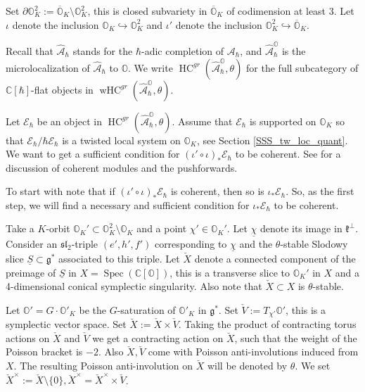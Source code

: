 \documentclass[12pt]{amsart}
\newcommand{\C}{\mathbb{C}}
\newcommand{\A}{\mathcal{A}}
\newcommand{\g}{\mathfrak{g}}
\newcommand{\Orb}{\mathbb{O}}
\newcommand{\kf}{\mathfrak{k}}
\newcommand{\HC}{\operatorname{HC}}
\newcommand{\wHC}{\operatorname{wHC}}
\newcommand{\slf}{\mathfrak{sl}}
\theoremstyle{definition}
\numberwithin{equation}{section}
\begin{document}
Set $\partial \Orb_K^2:=\overline{\Orb}_K\setminus \Orb_K^2$, this is
closed subvariety in $\overline{\Orb}_K$ of codimension at least $3$.
Let $\iota$ denote the inclusion $\Orb_K\hookrightarrow \Orb_K^2$ and
$\iota'$ denote the inclusion $\Orb_K^2\hookrightarrow \overline{\Orb}_K$.

Recall that $\hat{\A}_\hbar$ stands for the $\hbar$-adic completion of
$\A_\hbar$, and  $\hat{\A}_\hbar^\Orb$ is the microlocalization of $\hat{\A}_\hbar$ to $\Orb$.
We write $\HC^{gr}(\hat{\A}_\hbar^{\Orb},\theta)$ for the full subcategory of
$\C[\hbar]$-flat objects in $\wHC^{gr}(\hat{\A}_\hbar^{\Orb},\theta)$.


Let $\mathcal{E}_\hbar$ be an object in $\HC^{gr}(\hat{\A}_\hbar^{\Orb},\theta)$. Assume that $\mathcal{E}_\hbar$ is supported on $\Orb_K$
so that $\mathcal{E}_\hbar/\hbar \mathcal{E}_\hbar$ is a twisted local system on $\Orb_K$, see
Section \ref{SSS_tw_loc_quant}.
We want to get a sufficient
condition for $(\iota'\circ\iota)_* \mathcal{E}_\hbar$ to be coherent.
See \cite[Section 2.5]{HC_symp} for a discussion of coherent modules and the pushforwards.


To start with note that if $(\iota'\circ\iota)_* \mathcal{E}_\hbar$  is coherent,
then so is $\iota_*\mathcal{E}_\hbar$. So, as the first step, we will find a necessary and sufficient condition for $\iota_*\mathcal{E}_\hbar$ to be coherent.

Take a $K$-orbit $\Orb_K'\subset \Orb^2_K\setminus \Orb_K$ and a point $\chi'\in \Orb_K'$. Let $\underline{\chi}$
denote its image in $\kf^\perp$. Consider an $\slf_2$-triple $(e',h',f')$
corresponding to $\underline{\chi}$ and the $\theta$-stable  Slodowy slice $\underline{S}\subset \g^*$
associated to this triple. Let $\check{X}$ denote a connected component of the preimage of $\underline{S}$
in $X=\operatorname{Spec}(\C[\Orb])$, this is a transverse slice to $\Orb_K'$ in $X$  and a 4-dimensional conical 
symplectic singularity. Also note that $\check{X}\subset X$ is $\theta$-stable.

Let $\Orb'=G \cdot \Orb'_K$ be the $G$-saturation of $\Orb'_K$ in $\g^*$.
Set $\check{V}:=T_{\chi'}\Orb'$, this is a symplectic vector space. Set
$\breve{X}:=\check{X}\times \check{V}$. Taking the product of contracting torus
actions on $\check{X}$ and $\check{V}$ we get a contracting action on $\breve{X}$,
such that the weight of the Poisson bracket is $-2$. Also $\check{X},\check{V}$ come with
Poisson anti-involutions induced from $X$. The resulting Poisson anti-involution on
$\breve{X}$ will be denoted by $\theta$.
We set $\check{X}^\times:=\check{X} \setminus \{0\}, \breve{X}^\times=\check{X}^\times\times \check{V}$.
\end{document}
